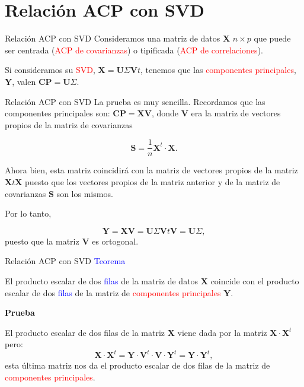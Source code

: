 \documentclass[
  ignorenonframetext,
]{beamer}
\newcommand\blue[1]{\textcolor{blue}{#1}}
\newcommand\red[1]{\textcolor{red}{#1}}
\begin{document}
\section{Relación ACP con SVD}\label{relaciuxf3n-acp-con-svd}

\begin{frame}{Relación ACP con SVD}
\label{relaciuxf3n-acp-con-svd-1}
Consideramos una matriz de datos \(\mathbf{X}\) \(n\times p\) que puede
ser centrada (\red{ACP de covarianzas}) o tipificada
(\red{ACP de correlaciones}).

Si consideramos su \red{SVD},
\(\mathbf{X}=\mathbf{U}\Sigma\mathbf{V}t\), tenemos que las
\red{componentes principales}, \(\mathbf{Y}\), valen
\(\mathbf{CP}=\mathbf{U}\Sigma\).
\end{frame}

\begin{frame}{Relación ACP con SVD}
\label{relaciuxf3n-acp-con-svd-2}
La prueba es muy sencilla. Recordamos que las componentes principales
son: \(\mathbf{CP}=\mathbf{X}\mathbf{V}\), donde \(\mathbf{V}\) era la
matriz de vectores propios de la matriz de covarianzas

\[\mathbf{S}=\frac{1}{n}\mathbf{X}^t\cdot \mathbf{X}.\]

Ahora bien, esta matriz coincidirá con la matriz de vectores propios de
la matriz \(\mathbf{X}t\mathbf{X}\) puesto que los vectores propios de
la matriz anterior y de la matriz de covarianzas \(\mathbf{S}\) son los
mismos.

Por lo tanto,

\[\mathbf{Y}=\mathbf{X}\mathbf{V}=\mathbf{U}\Sigma\mathbf{V}t\mathbf{V}=\mathbf{U}\Sigma,\]
puesto que la matriz \(\mathbf{V}\) es ortogonal.
\end{frame}

\begin{frame}{Relación ACP con SVD}
\label{relaciuxf3n-acp-con-svd-3}
\blue{Teorema}

El producto escalar de dos \blue{filas} de la matriz de datos
\(\mathbf{X}\) coincide con el producto escalar de dos \blue{filas} de
la matriz de \red{componentes principales} \(\mathbf{Y}\).

\textbf{Prueba}

El producto escalar de dos filas de la matriz \(\mathbf{X}\) viene dada
por la matriz \(\mathbf{X}\cdot\mathbf{X}^t\) pero: \[
\mathbf{X}\cdot \mathbf{X}^t= \mathbf{Y}\cdot \mathbf{V}^t\cdot\mathbf{V}\cdot\mathbf{Y}^t=\mathbf{Y}\cdot\mathbf{Y}^t,
\] esta última matriz nos da el producto escalar de dos filas de la
matriz de \red{componentes principales}.
\end{frame}
\end{document}
